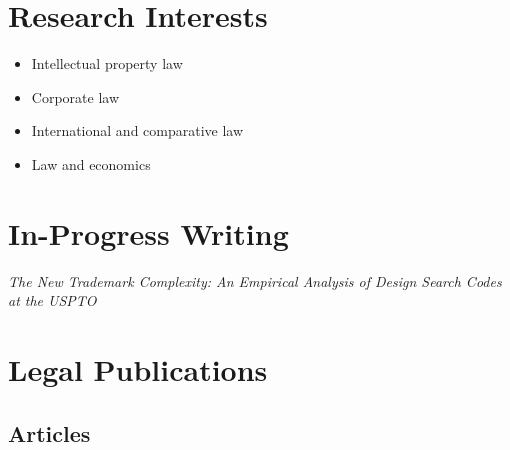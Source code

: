 \documentclass[10pt]{article}
\newenvironment{gnoindent}
{\begin{adjustwidth}{10pt}{50pt}\setlength{\parindent}{0pt}}
{\end{adjustwidth}}
\newcommand{\years}[1]{\marginnote{\scriptsize #1}}
\begin{document}
\section*{Research Interests}

\begin{itemize}
\item Intellectual property law
\item Corporate law
\item International and comparative law
\item Law and economics
\end{itemize}

\section*{In-Progress Writing}

\begin{gnoindent}
\years{2024} \textit{The New Trademark Complexity: An Empirical Analysis of Design Search Codes at the USPTO} \par
\end{gnoindent}

\section*{Legal Publications}

\subsection*{Articles}
\end{document}
